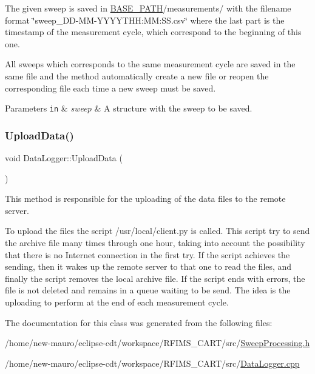 The given sweep is saved in \hyperlink{Basics_8h_a0423f4cb393331ce0b9f6b3a43adcaae}{B\+A\+S\+E\+\_\+\+P\+A\+TH}/measurements/ with the filename format \char`\"{}sweep\+\_\+\+D\+D-\/\+M\+M-\/\+Y\+Y\+Y\+Y\+T\+H\+H\+:\+M\+M\+:\+S\+S.\+csv\char`\"{} where the last part is the timestamp of the measurement cycle, which correspond to the beginning of this one.

All sweeps which corresponds to the same measurement cycle are saved in the same file and the method automatically create a new file or reopen the corresponding file each time a new sweep must be saved. 
\begin{DoxyParams}[1]{Parameters}
\mbox{\tt in}  & {\em sweep} & A structure with the sweep to be saved. \\
\hline
\end{DoxyParams}
\mbox{\label{classDataLogger_ab58f4cc05f738ef757c884fe9ef131eb}} 
\subsubsection{\texorpdfstring{Upload\+Data()}{UploadData()}}
{\footnotesize\ttfamily void Data\+Logger\+::\+Upload\+Data (\begin{DoxyParamCaption}{ }\end{DoxyParamCaption})}



This method is responsible for the uploading of the data files to the remote server. 

To upload the files the script /usr/local/client.py is called. This script try to send the archive file many times through one hour, taking into account the possibility that there is no Internet connection in the first try. If the script achieves the sending, then it wakes up the remote server to that one to read the files, and finally the script removes the local archive file. If the script ends with errors, the file is not deleted and remains in a queue waiting to be send. The idea is the uploading to perform at the end of each measurement cycle. 

The documentation for this class was generated from the following files\+:\begin{DoxyCompactItemize}
\item 
/home/new-\/mauro/eclipse-\/cdt/workspace/\+R\+F\+I\+M\+S\+\_\+\+C\+A\+R\+T/src/\hyperlink{SweepProcessing_8h}{Sweep\+Processing.\+h}\item 
/home/new-\/mauro/eclipse-\/cdt/workspace/\+R\+F\+I\+M\+S\+\_\+\+C\+A\+R\+T/src/\hyperlink{DataLogger_8cpp}{Data\+Logger.\+cpp}\end{DoxyCompactItemize}
